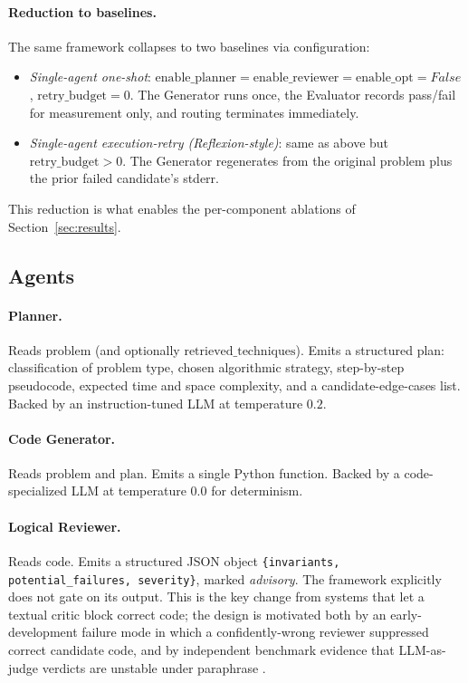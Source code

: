 \documentclass[journal]{IEEEtran}
\begin{document}
\paragraph{Reduction to baselines.}
The same framework collapses to two baselines via configuration:
\begin{itemize}
  \item \emph{Single-agent one-shot}: $\text{enable\_planner} = \text{enable\_reviewer} = \text{enable\_opt} = \mathit{False}$, $\text{retry\_budget} = 0$. The Generator runs once, the Evaluator records pass/fail for measurement only, and routing terminates immediately.
  \item \emph{Single-agent execution-retry (Reflexion-style)}: same as above but $\text{retry\_budget} > 0$. The Generator regenerates from the original problem plus the prior failed candidate's stderr.
\end{itemize}
This reduction is what enables the per-component ablations of Section~\ref{sec:results}.

\subsection{Agents}\label{sec:agents}

\paragraph{Planner.} Reads $\text{problem}$ (and optionally $\text{retrieved\_techniques}$). Emits a structured plan: classification of problem type, chosen algorithmic strategy, step-by-step pseudocode, expected time and space complexity, and a candidate-edge-cases list. Backed by an instruction-tuned LLM at temperature $0.2$.

\paragraph{Code Generator.} Reads $\text{problem}$ and $\text{plan}$. Emits a single Python function. Backed by a code-specialized LLM at temperature $0.0$ for determinism.

\paragraph{Logical Reviewer.} Reads $\text{code}$. Emits a structured JSON object \texttt{\{invariants, potential\_failures, severity\}}, marked \emph{advisory}. The framework explicitly does not gate on its output. This is the key change from systems that let a textual critic block correct code; the design is motivated both by an early-development failure mode in which a confidently-wrong reviewer suppressed correct candidate code, and by independent benchmark evidence that LLM-as-judge verdicts are unstable under paraphrase \cite{judgesense2026}.
\end{document}
